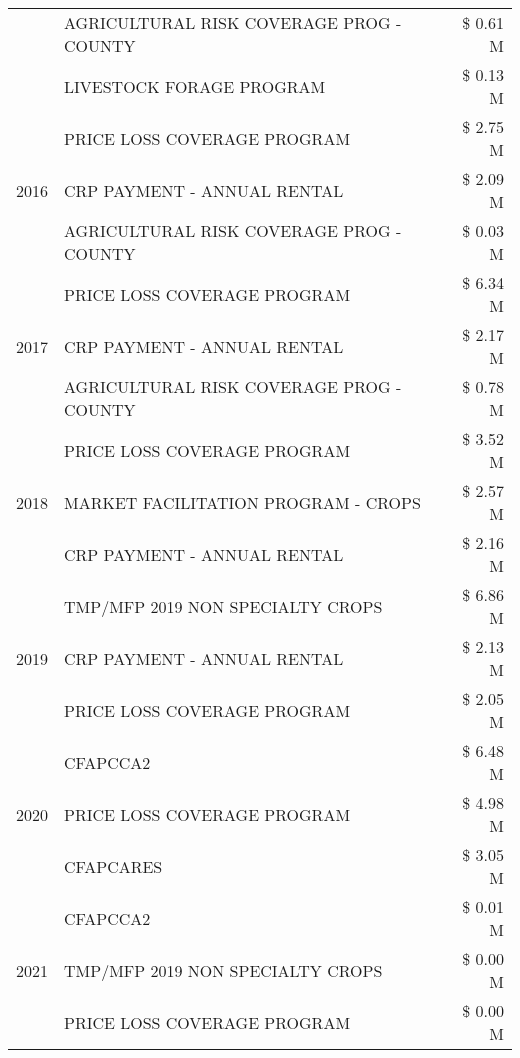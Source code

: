 \begin{tabular}{llr}
 & AGRICULTURAL RISK COVERAGE PROG - COUNTY & \$ 0.61 M \\
 & LIVESTOCK FORAGE PROGRAM & \$ 0.13 M \\
\cline{1-3}
\multirow[t]{3}{*}{2016} & PRICE LOSS COVERAGE PROGRAM & \$ 2.75 M \\
 & CRP PAYMENT - ANNUAL RENTAL & \$ 2.09 M \\
 & AGRICULTURAL RISK COVERAGE PROG - COUNTY & \$ 0.03 M \\
\cline{1-3}
\multirow[t]{3}{*}{2017} & PRICE LOSS COVERAGE PROGRAM & \$ 6.34 M \\
 & CRP PAYMENT - ANNUAL RENTAL & \$ 2.17 M \\
 & AGRICULTURAL RISK COVERAGE PROG - COUNTY & \$ 0.78 M \\
\cline{1-3}
\multirow[t]{3}{*}{2018} & PRICE LOSS COVERAGE PROGRAM & \$ 3.52 M \\
 & MARKET FACILITATION PROGRAM - CROPS & \$ 2.57 M \\
 & CRP PAYMENT - ANNUAL RENTAL & \$ 2.16 M \\
\cline{1-3}
\multirow[t]{3}{*}{2019} & TMP/MFP 2019 NON SPECIALTY CROPS & \$ 6.86 M \\
 & CRP PAYMENT - ANNUAL RENTAL & \$ 2.13 M \\
 & PRICE LOSS COVERAGE PROGRAM & \$ 2.05 M \\
\cline{1-3}
\multirow[t]{3}{*}{2020} & CFAPCCA2 & \$ 6.48 M \\
 & PRICE LOSS COVERAGE PROGRAM & \$ 4.98 M \\
 & CFAPCARES & \$ 3.05 M \\
\cline{1-3}
\multirow[t]{3}{*}{2021} & CFAPCCA2 & \$ 0.01 M \\
 & TMP/MFP 2019 NON SPECIALTY CROPS & \$ 0.00 M \\
 & PRICE LOSS COVERAGE PROGRAM & \$ 0.00 M \\
\cline{1-3}
\bottomrule
\end{tabular}
